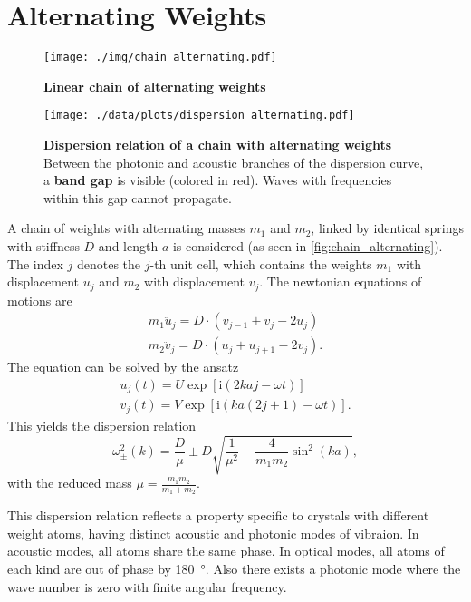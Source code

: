 \section{Alternating Weights}
\begin{figure}[tbp]
	\centering
	\texttt{[image: ./img/chain\_alternating.pdf]}
	\caption[Chain of Alternating Weights]{\textbf{Linear chain of alternating weights}}
	\label{fig:chain_alternating}
\end{figure}
\begin{figure}[tbp]
	\centering
	\texttt{[image: ./data/plots/dispersion\_alternating.pdf]}
	\caption[Dispersion Relation of Chain With Identical Weights]{\textbf{Dispersion relation of a chain with alternating weights} Between the photonic and acoustic branches of the dispersion curve, a \textbf{band gap} is visible (colored in red). Waves with frequencies within this gap cannot propagate.}
	\label{fig:dispersion_alternating}
\end{figure}
A chain of weights with alternating masses $m_1$ and $m_2$, linked by identical springs with stiffness $D$ and length $a$ is considered (as seen in \autoref{fig:chain_alternating}).
The index $j$ denotes the $j$-th unit cell, which contains the weights $m_1$ with displacement $u_j$ and $m_2$ with displacement $v_j$.
The newtonian equations of motions are
\begin{gather*}
	m_1 \ddot u_j = D \cdot \left(v_{j - 1} + v_{j} - 2 u_j \right)\\
	m_2 \ddot v_j = D \cdot \left(u_{j} + u_{j + 1} - 2 v_j \right).
\end{gather*}
The equation can be solved by the ansatz
\begin{gather*}
	u_j(t) = U \exp\left[\text{i} \left(2 k a j - \omega t\right)\right]\\
	v_j(t) = V \exp\left[\text{i} \left(k a (2 j + 1) - \omega t\right)\right].
\end{gather*}
This yields the dispersion relation
\begin{equation}
	\omega_\pm^2(k) = \frac{D}{\mu} \pm D\sqrt{\frac{1}{\mu^2} - \frac{4}{m_1 m_2}\sin^2\left(k a\right)},
\end{equation}
with the reduced mass $\mu = \frac{m_1 m_2}{m_1 + m_2}$.

This dispersion relation reflects a property specific to crystals with different weight atoms, having distinct acoustic and photonic modes of vibraion.
In acoustic modes, all atoms share the same phase.
In optical modes, all atoms of each kind are out of phase by \SI{180}{\degree}.
Also there exists a photonic mode where the wave number is zero with finite angular frequency.
